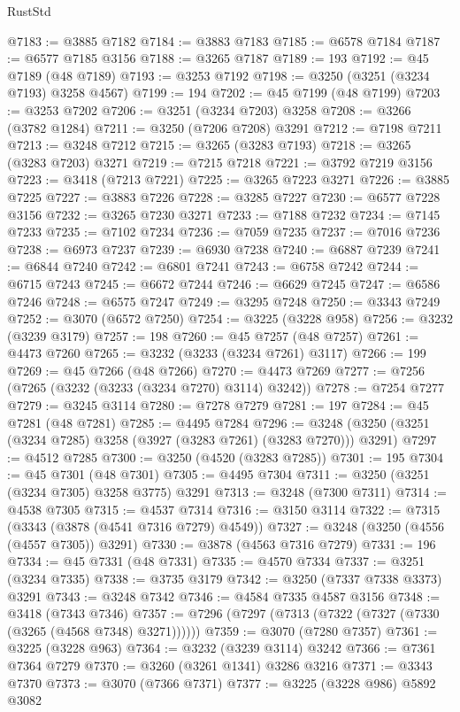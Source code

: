 \begin{lexlean}{RustStd}
\begin{coremodule}
@7183 := @3885 @7182
@7184 := @3883 @7183
@7185 := @6578 @7184
@7187 := @6577 @7185 @3156
@7188 := @3265 @7187
@7189 := 193
@7192 := @45 @7189 (@48 @7189)
@7193 := @3253 @7192
@7198 := @3250 (@3251 (@3234 @7193) @3258 @4567)
@7199 := 194
@7202 := @45 @7199 (@48 @7199)
@7203 := @3253 @7202
@7206 := @3251 (@3234 @7203) @3258
@7208 := @3266 (@3782 @1284)
@7211 := @3250 (@7206 @7208) @3291
@7212 := @7198 @7211
@7213 := @3248 @7212
@7215 := @3265 (@3283 @7193)
@7218 := @3265 (@3283 @7203) @3271
@7219 := @7215 @7218
@7221 := @3792 @7219 @3156
@7223 := @3418 (@7213 @7221)
@7225 := @3265 @7223 @3271
@7226 := @3885 @7225
@7227 := @3883 @7226
@7228 := @3285 @7227
@7230 := @6577 @7228 @3156
@7232 := @3265 @7230 @3271
@7233 := @7188 @7232
@7234 := @7145 @7233
@7235 := @7102 @7234
@7236 := @7059 @7235
@7237 := @7016 @7236
@7238 := @6973 @7237
@7239 := @6930 @7238
@7240 := @6887 @7239
@7241 := @6844 @7240
@7242 := @6801 @7241
@7243 := @6758 @7242
@7244 := @6715 @7243
@7245 := @6672 @7244
@7246 := @6629 @7245
@7247 := @6586 @7246
@7248 := @6575 @7247
@7249 := @3295 @7248
@7250 := @3343 @7249
@7252 := @3070 (@6572 @7250)
@7254 := @3225 (@3228 @958)
@7256 := @3232 (@3239 @3179)
@7257 := 198
@7260 := @45 @7257 (@48 @7257)
@7261 := @4473 @7260
@7265 := @3232 (@3233 (@3234 @7261) @3117)
@7266 := 199
@7269 := @45 @7266 (@48 @7266)
@7270 := @4473 @7269
@7277 := @7256 (@7265 (@3232 (@3233 (@3234 @7270) @3114) @3242))
@7278 := @7254 @7277
@7279 := @3245 @3114
@7280 := @7278 @7279
@7281 := 197
@7284 := @45 @7281 (@48 @7281)
@7285 := @4495 @7284
@7296 := @3248 (@3250 (@3251 (@3234 @7285) @3258 (@3927 (@3283 @7261) (@3283 @7270))) @3291)
@7297 := @4512 @7285
@7300 := @3250 (@4520 (@3283 @7285))
@7301 := 195
@7304 := @45 @7301 (@48 @7301)
@7305 := @4495 @7304
@7311 := @3250 (@3251 (@3234 @7305) @3258 @3775) @3291
@7313 := @3248 (@7300 @7311)
@7314 := @4538 @7305
@7315 := @4537 @7314
@7316 := @3150 @3114
@7322 := @7315 (@3343 (@3878 (@4541 @7316 @7279) @4549))
@7327 := @3248 (@3250 (@4556 (@4557 @7305)) @3291)
@7330 := @3878 (@4563 @7316 @7279)
@7331 := 196
@7334 := @45 @7331 (@48 @7331)
@7335 := @4570 @7334
@7337 := @3251 (@3234 @7335)
@7338 := @3735 @3179
@7342 := @3250 (@7337 @7338 @3373) @3291
@7343 := @3248 @7342
@7346 := @4584 @7335 @4587 @3156
@7348 := @3418 (@7343 @7346)
@7357 := @7296 (@7297 (@7313 (@7322 (@7327 (@7330 (@3265 (@4568 @7348) @3271))))))
@7359 := @3070 (@7280 @7357)
@7361 := @3225 (@3228 @963)
@7364 := @3232 (@3239 @3114) @3242
@7366 := @7361 @7364 @7279
@7370 := @3260 (@3261 @1341) @3286 @3216
@7371 := @3343 @7370
@7373 := @3070 (@7366 @7371)
@7377 := @3225 (@3228 @986) @5892 @3082

\end{coremodule}
\end{lexlean}

